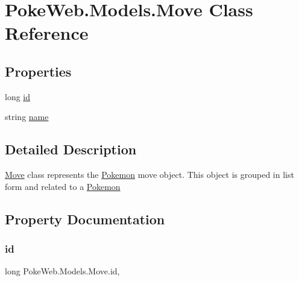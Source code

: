 \hypertarget{class_poke_web_1_1_models_1_1_move}{}\section{Poke\+Web.\+Models.\+Move Class Reference}
\label{class_poke_web_1_1_models_1_1_move}
\subsection*{Properties}
\begin{DoxyCompactItemize}
\item 
long \mbox{\hyperlink{class_poke_web_1_1_models_1_1_move_a3095d605c6c2a3f9e466f3d03592e4bd}{id}}
\item 
string \mbox{\hyperlink{class_poke_web_1_1_models_1_1_move_a78bbe5e25915a5edc31479c696e80274}{name}}
\end{DoxyCompactItemize}


\subsection{Detailed Description}
\mbox{\hyperlink{class_poke_web_1_1_models_1_1_move}{Move}} class represents the \mbox{\hyperlink{class_poke_web_1_1_models_1_1_pokemon}{Pokemon}} move object. This object is grouped in list form and related to a \mbox{\hyperlink{class_poke_web_1_1_models_1_1_pokemon}{Pokemon}} 

\subsection{Property Documentation}
\mbox{\label{class_poke_web_1_1_models_1_1_move_a3095d605c6c2a3f9e466f3d03592e4bd}} 
\subsubsection{\texorpdfstring{id}{id}}
{\footnotesize\ttfamily long Poke\+Web.\+Models.\+Move.\+id\hspace{0.3cm}{\ttfamily [get]}, {\ttfamily [set]}}

